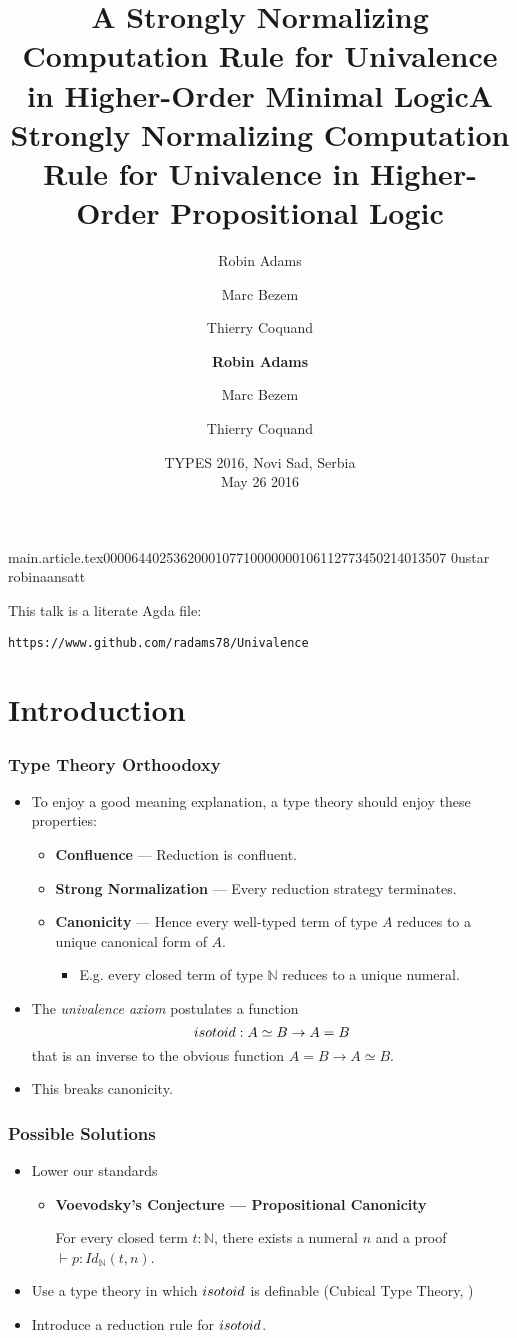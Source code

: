 main.article.tex                                                                                    0000644 0253620 0010771 00000001061 12773450214 013507  0                                                                                                    ustar   robina                          ansatt                                                                                                                                                                                                                 \documentclass{article}
\title{A Strongly Normalizing Computation Rule for Univalence in Higher-Order Minimal Logic}
\author{Robin Adams \and Marc Bezem \and Thierry Coquand}
\title[SN Rule for Univalence]{A Strongly Normalizing Computation Rule for Univalence in Higher-Order Propositional Logic}
\author[R. Adams, M. Bezem, T. Coquand]{\textbf{Robin Adams} \and Marc Bezem \and Thierry Coquand}
\date[TYPES 2016]{TYPES 2016, Novi Sad, Serbia \\ May 26 2016}
\newcommand{\url}[1]{\texttt{#1}}
\begin{document}
\begin{frame}

\maketitle

This talk is a literate Agda file:

\url{https://www.github.com/radams78/Univalence}
\end{frame}

\section{Introduction}

\begin{frame}
\frametitle{Type Theory Orthoodoxy}
\begin{itemize}[<+->]
\item
To enjoy a good meaning explanation, a type theory should enjoy these properties:
\begin{itemize}
\item \textbf{Confluence} --- Reduction is confluent.
\item \textbf{Strong Normalization} --- Every reduction strategy terminates.
\item \textbf{Canonicity} --- Hence every well-typed term of type $A$ reduces to a unique canonical form of $A$.
\begin{itemize}
\item
E.g. every closed term of type $\mathbb{N}$ reduces to a unique numeral.
\end{itemize}
\end{itemize}
\item 
The \emph{univalence axiom} postulates a function
\[ isotoid : A \simeq B \rightarrow A = B \]
that is an inverse to the obvious function $A = B \rightarrow A \simeq B$.
\item
This breaks canonicity.
\end{itemize}
\end{frame}

\begin{frame}
\frametitle{Possible Solutions}
\begin{itemize}[<+->]
\item
Lower our standards
\begin{itemize}
\item
\textbf{Voevodsky's Conjecture --- Propositional Canonicity}

For every closed term $t : \mathbb{N}$, there exists a numeral $n$ and a proof $\vdash p : Id_\mathbb{N}(t,n)$.
\end{itemize}
\item
Use a type theory in which $isotoid$ is definable (Cubical Type Theory, \cite{Polonsky14a}) %
\item
Introduce a reduction rule for $isotoid$.
\end{itemize}
\end{frame}
\end{document}
